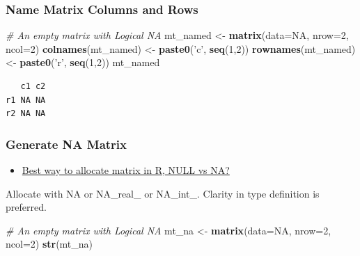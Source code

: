 \documentclass[
]{book}
\newenvironment{Shaded}{\begin{snugshade}}{\end{snugshade}}
\newcommand{\CommentTok}[1]{\textcolor[rgb]{0.56,0.35,0.01}{\textit{#1}}}
\newcommand{\DataTypeTok}[1]{\textcolor[rgb]{0.13,0.29,0.53}{#1}}
\newcommand{\DecValTok}[1]{\textcolor[rgb]{0.00,0.00,0.81}{#1}}
\newcommand{\KeywordTok}[1]{\textcolor[rgb]{0.13,0.29,0.53}{\textbf{#1}}}
\newcommand{\NormalTok}[1]{#1}
\newcommand{\OtherTok}[1]{\textcolor[rgb]{0.56,0.35,0.01}{#1}}
\newcommand{\StringTok}[1]{\textcolor[rgb]{0.31,0.60,0.02}{#1}}
\providecommand{\tightlist}{%
  \setlength{\itemsep}{0pt}\setlength{\parskip}{0pt}}
\begin{document}
\hypertarget{name-matrix-columns-and-rows}{%
\subsubsection{Name Matrix Columns and Rows}\label{name-matrix-columns-and-rows}}

\begin{Shaded}
\begin{Highlighting}[]
\CommentTok{# An empty matrix with Logical NA}
\NormalTok{mt_named <-}\StringTok{ }\KeywordTok{matrix}\NormalTok{(}\DataTypeTok{data=}\OtherTok{NA}\NormalTok{, }\DataTypeTok{nrow=}\DecValTok{2}\NormalTok{, }\DataTypeTok{ncol=}\DecValTok{2}\NormalTok{)}
\KeywordTok{colnames}\NormalTok{(mt_named) <-}\StringTok{ }\KeywordTok{paste0}\NormalTok{(}\StringTok{'c'}\NormalTok{, }\KeywordTok{seq}\NormalTok{(}\DecValTok{1}\NormalTok{,}\DecValTok{2}\NormalTok{))}
\KeywordTok{rownames}\NormalTok{(mt_named) <-}\StringTok{ }\KeywordTok{paste0}\NormalTok{(}\StringTok{'r'}\NormalTok{, }\KeywordTok{seq}\NormalTok{(}\DecValTok{1}\NormalTok{,}\DecValTok{2}\NormalTok{))}
\NormalTok{mt_named}
\end{Highlighting}
\end{Shaded}

\begin{verbatim}
   c1 c2
r1 NA NA
r2 NA NA
\end{verbatim}

\hypertarget{generate-na-matrix}{%
\subsubsection{Generate NA Matrix}\label{generate-na-matrix}}

\begin{itemize}
\tightlist
\item
  \href{https://stackoverflow.com/a/26724451/8280804}{Best way to allocate matrix in R, NULL vs NA?}
\end{itemize}

Allocate with NA or NA\_real\_ or NA\_int\_. Clarity in type definition is preferred.

\begin{Shaded}
\begin{Highlighting}[]
\CommentTok{# An empty matrix with Logical NA}
\NormalTok{mt_na <-}\StringTok{ }\KeywordTok{matrix}\NormalTok{(}\DataTypeTok{data=}\OtherTok{NA}\NormalTok{, }\DataTypeTok{nrow=}\DecValTok{2}\NormalTok{, }\DataTypeTok{ncol=}\DecValTok{2}\NormalTok{)}
\KeywordTok{str}\NormalTok{(mt_na)}
\end{Highlighting}
\end{Shaded}
\end{document}
